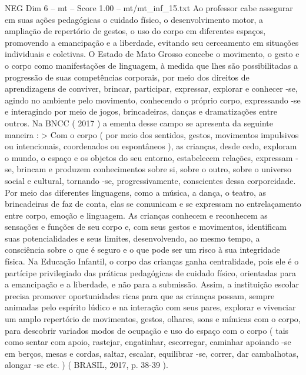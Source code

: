 \begin{textsample}{NEG Dim 6 – mt – Score 1.00 – mt/mt\_inf\_15.txt}
Ao professor cabe assegurar em suas ações pedagógicas o cuidado físico, o desenvolvimento motor, a ampliação de repertório de gestos, o uso do corpo em diferentes espaços, promovendo a emancipação e a liberdade, evitando seu cerceamento em situações individuais e coletivas.
O Estado de Mato Grosso concebe o movimento, o gesto e o corpo como manifestações de linguagem, à medida que lhes são possibilitadas a progressão de suas competências corporais, por meio dos direitos de aprendizagens de conviver, brincar, participar, expressar, explorar e conhecer -se, agindo no ambiente pelo movimento, conhecendo o próprio corpo, expressando -se e interagindo por meio de jogos, brincadeiras, danças e dramatizações entre outros.
Na BNCC ( 2017 ) a ementa desse campo se apresenta da seguinte maneira : > Com o corpo ( por meio dos sentidos, gestos, movimentos impulsivos ou intencionais, coordenados ou espontâneos ), as crianças, desde cedo, exploram o mundo, o espaço e os objetos do seu entorno, estabelecem relações, expressam -se, brincam e produzem conhecimentos sobre si, sobre o outro, sobre o universo social e cultural, tornando -se, progressivamente, conscientes dessa corporeidade.
Por meio das diferentes linguagens, como a música, a dança, o teatro, as brincadeiras de faz de conta, elas se comunicam e se expressam no entrelaçamento entre corpo, emoção e linguagem.
As crianças conhecem e reconhecem as sensações e funções de seu corpo e, com seus gestos e movimentos, identificam suas potencialidades e seus limites, desenvolvendo, ao mesmo tempo, a consciência sobre o que é seguro e o que pode ser um risco à sua integridade física.
Na Educação Infantil, o corpo das crianças ganha centralidade, pois ele é o partícipe privilegiado das práticas pedagógicas de cuidado físico, orientadas para a emancipação e a liberdade, e não para a submissão.
Assim, a instituição escolar precisa promover oportunidades ricas para que as crianças possam, sempre animadas pelo espírito lúdico e na interação com seus pares, explorar e vivenciar um amplo repertório de movimentos, gestos, olhares, sons e mímicas com o corpo, para descobrir variados modos de ocupação e uso do espaço com o corpo ( tais como sentar com apoio, rastejar, engatinhar, escorregar, caminhar apoiando -se em berços, mesas e cordas, saltar, escalar, equilibrar -se, correr, dar cambalhotas, alongar -se etc. ) ( BRASIL, 2017, p. 38-39 ).

\end{textsample}
